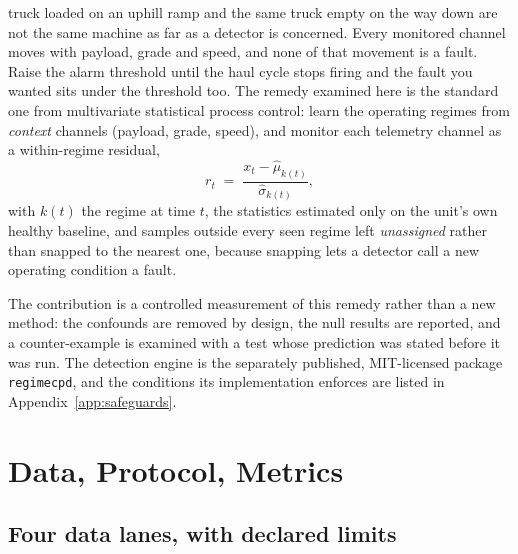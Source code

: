 \documentclass[journal]{IEEEtran}
\begin{document}
 truck loaded on an uphill ramp and the same truck empty on the way down are not
the same machine as far as a detector is concerned. Every monitored channel moves with payload, grade
and speed, and none of that movement is a fault. Raise the alarm threshold until the haul cycle stops
firing and the fault you wanted sits under the threshold too. The remedy examined here is the standard
one from multivariate statistical process control: learn the operating regimes from \emph{context}
channels (payload, grade, speed), and monitor each telemetry channel as a within-regime residual,
\begin{equation}
r_t \;=\; \frac{x_t - \hat{\mu}_{k(t)}}{\hat{\sigma}_{k(t)}},
\label{eq:residual}
\end{equation}
with $k(t)$ the regime at time $t$, the statistics estimated only on the unit's own healthy baseline,
and samples outside every seen regime left \emph{unassigned} rather than snapped to the nearest one,
because snapping lets a detector call a new operating condition a fault.

The contribution is a controlled measurement of this remedy rather than a new method: the confounds are
removed by design, the null results are reported, and a counter-example is examined with a test whose
prediction was stated before it was run. The detection engine is the separately published, MIT-licensed
package \texttt{regimecpd}, and the conditions its implementation enforces are listed in
Appendix~\ref{app:safeguards}.

\section{Data, Protocol, Metrics}

\subsection{Four data lanes, with declared limits}
\end{document}
